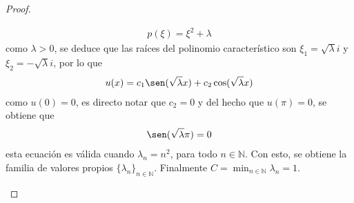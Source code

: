 \documentclass[10pt,a4paper]{report}
\theoremstyle{definition}
\renewcommand{\theproblem}{\Alph{problem}}
\numberwithin{equation}{problem}
\begin{document}
\begin{proof}
\begin{enumerate}[label=\textbf{\theproblem.\Roman{*}.},ref=\theproblem.\Roman{*},parsep=1ex]
           \begin{align}
           	p(\xi) = \xi^{2} + \lambda
           \end{align} 
           como $\lambda>0$, se deduce que las raíces del polinomio característico son $\xi_{1} = \sqrt{\lambda}i$ y $\xi_{2} = -\sqrt{\lambda}i$, por lo que
           \begin{align*}
           	u(x) = c_{1}\sen(\sqrt{\lambda}x) + c_{2}\cos(\sqrt{\lambda}x)
           \end{align*}
           como $u(0) = 0$, es directo notar que $c_{2} = 0$ y del hecho que $u(\pi) = 0$, se obtiene que 
           \begin{align*}
           	\sen(\sqrt{\lambda}\pi) = 0
           \end{align*}
           esta ecuación es válida cuando $\lambda_{n} = n^{2}$, para todo $n\in\mathbb{N}$. Con esto, se obtiene la familia de valores propios $\{\lambda_{n}\}_{n\in \mathbb{N}}$. Finalmente $\displaystyle C = \min_{n\in\mathbb{N}}\lambda_{n} = 1$.
    	\end{enumerate}
    \end{proof}
	
	\bigskip
	
\end{document}
